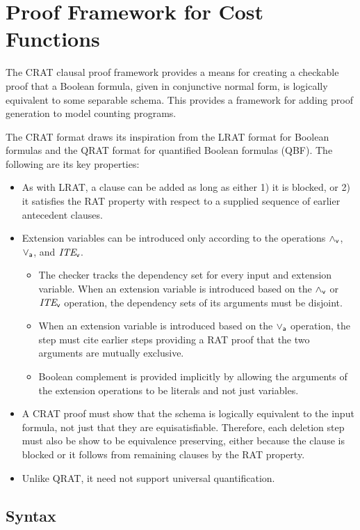 \documentclass{llncs}
\newcommand{\pand}{\mathbin{\land_{\sf v}}}
\newcommand{\por}{\mathbin{\lor_{\sf a}}}
\newcommand{\pite}{\mbox{\it ITE}_{\sf v}}
\begin{document}
\section{Proof Framework for Cost Functions}

The CRAT clausal proof framework provides a means for creating a
checkable proof that a Boolean formula, given in conjunctive normal
form, is logically equivalent to some separable schema.  This provides
a framework for adding proof generation to model counting programs.

The CRAT format draws its inspiration from the LRAT format for Boolean formulas and the
QRAT format for
quantified Boolean formulas (QBF).  The following are its key properties:
\begin{itemize}
\item As with LRAT, a clause can be added as long as either 1) it is
  blocked, or 2) it satisfies the RAT property with respect to a supplied sequence
  of earlier antecedent clauses.
\item  Extension variables can be introduced only according to the operations $\pand$, $\por$, and $\pite$.
\begin{itemize}
\item The checker tracks the dependency set for every input and
  extension variable.  When an extension variable is introduced based
  on the $\pand$ or $\pite$ operation, the dependency sets of its arguments must
  be disjoint.
\item When an extension variable is introduced based on the $\por$
  operation, the step must cite earlier steps providing a RAT proof
  that the two arguments are mutually exclusive.
\item Boolean complement is provided implicitly by allowing the
  arguments of the extension operations to be literals and not just
  variables.
\end{itemize}
\item A CRAT proof must show that the schema is logically equivalent
  to the input formula, not just that they are equisatisfiable.
  Therefore, each deletion step must also be show to be equivalence
  preserving, either because the clause is blocked or it follows from
  remaining clauses by the RAT property.
\item Unlike QRAT, it need not support universal quantification.
\end{itemize}

\subsection{Syntax}
\end{document}
